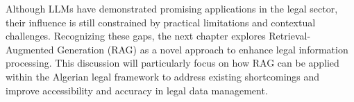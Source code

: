 Although LLMs have demonstrated promising applications in the legal sector, their influence is still constrained by practical limitations and contextual challenges. Recognizing these gaps, the next chapter explores Retrieval-Augmented Generation (RAG) as a novel approach to enhance legal information processing. This discussion will particularly focus on how RAG can be applied within the Algerian legal framework to address existing shortcomings and improve accessibility and accuracy in legal data management.
